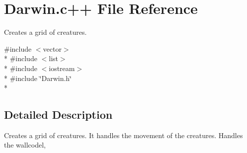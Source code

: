 \hypertarget{Darwin_8c_09_09}{\section{Darwin.\-c++ File Reference}
\label{Darwin_8c_09_09}
}


Creates a grid of creatures.  


{\ttfamily \#include $<$vector$>$}\\*
{\ttfamily \#include $<$list$>$}\\*
{\ttfamily \#include $<$iostream$>$}\\*
{\ttfamily \#include \char`\"{}Darwin.\-h\char`\"{}}\\*


\subsection{Detailed Description}
Creates a grid of creatures. It handles the movement of the creatures. Handles the wallcodel, 